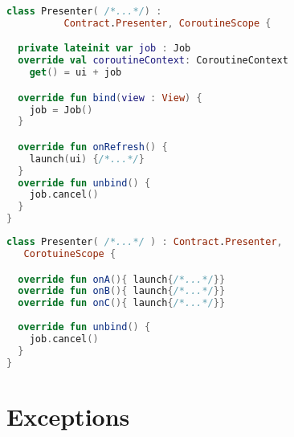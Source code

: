 \documentclass[10pt]{beamer}
\begin{document}
\begin{frame}[fragile]
\begin{lstlisting}[language=Kotlin, basicstyle=\ttfamily]
class Presenter( /*...*/) : 
          Contract.Presenter, CoroutineScope {

  private lateinit var job : Job
  override val coroutineContext: CoroutineContext
    get() = ui + job

  override fun bind(view : View) {
    job = Job()  
  }

  override fun onRefresh() {
    launch(ui) {/*...*/}
  }
  override fun unbind() {
    job.cancel()
  }
}
\end{lstlisting}
\end{frame}
\begin{frame}[fragile]
\begin{lstlisting}[language=Kotlin, basicstyle=\ttfamily]
class Presenter( /*...*/ ) : Contract.Presenter,
   CorotuineScope {

  override fun onA(){ launch{/*...*/}}
  override fun onB(){ launch{/*...*/}}
  override fun onC(){ launch{/*...*/}}
  
  override fun unbind() {
    job.cancel() 
  }
}
\end{lstlisting}
\end{frame}



\section{Exceptions}

\begin{frame}[fragile]
\begin{lstlisting}[language=Kotlin, basicstyle=\ttfamily]
\end{lstlisting}
\end{frame}


\begin{frame}[fragile]
\begin{lstlisting}[language=Kotlin, basicstyle=\ttfamily]
\end{lstlisting}
\end{frame}

\begin{frame}[fragile]
\begin{lstlisting}[language=Kotlin, basicstyle=\ttfamily]
\end{lstlisting}
\end{frame}
\end{document}
